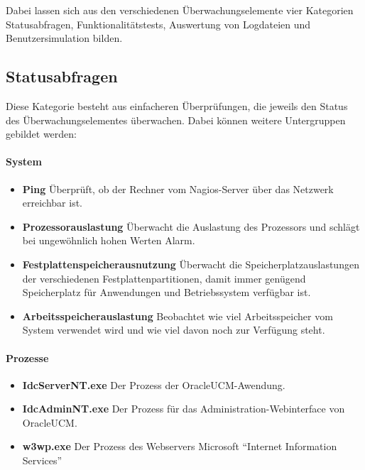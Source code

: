 Dabei lassen sich aus den verschiedenen Überwachungselemente vier Kategorien Statusabfragen, Funktionalitätstests, Auswertung von Logdateien und Benutzersimulation bilden.

\subsection{Statusabfragen}
\label{syschecks}
Diese Kategorie besteht aus einfacheren Überprüfungen, die jeweils den Status des Überwachungselementes überwachen.
Dabei können weitere Untergruppen gebildet werden:

\paragraph{System}
\begin{itemize}
\item \textbf{Ping} Überprüft, ob der Rechner vom Nagios-Server über das Netzwerk erreichbar ist.
\item \textbf{Prozessorauslastung} Überwacht die Auslastung des Prozessors und schlägt bei ungewöhnlich hohen Werten Alarm.
\item \textbf{Festplattenspeicherausnutzung} Überwacht die Speicherplatzauslastungen der verschiedenen Festplattenpartitionen, damit immer genügend Speicherplatz für Anwendungen und Betriebssystem verfügbar ist.
\item \textbf{Arbeitsspeicherauslastung} Beobachtet wie viel Arbeitsspeicher vom System verwendet wird und wie viel davon noch zur Verfügung steht.
\end{itemize}

\paragraph{Prozesse}
\begin{itemize}
\item \textbf{IdcServerNT.exe} Der Prozess der \gls{OracleUCM}-Awendung.
\item \textbf{IdcAdminNT.exe} Der Prozess für das Administration-Webinterface von \gls{OracleUCM}.
\item \textbf{w3wp.exe} Der Prozess des Webservers Microsoft "`Internet Information Services"'
\end{itemize}

